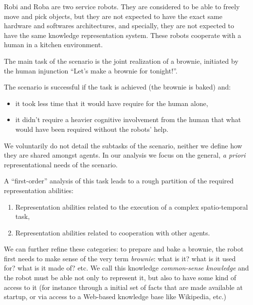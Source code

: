 \documentclass[a4paper, twocolumn]{article}
\begin{document}
Robi and Roba are two service robots. They are considered to be able to freely
move and pick objects, but they are not expected to have the exact same
hardware and softwares architectures, and specially, they are not expected to
have the same knowledge representation system. These robots cooperate with a
human in a kitchen environment.

The main task of the scenario is the joint realization of a brownie, initiated
by the human injunction ``Let's make a brownie for tonight!''.

The scenario is successful if the task is achieved (the brownie is baked) and:

\begin{itemize} 

	\item it took less time that it would have require for the human alone, 

	\item it didn't require a heavier cognitive involvement from the human that
	what would have been required without the robots' help.  

\end{itemize}

We voluntarily do not detail the subtasks of the scenario, neither we define
how they are shared amongst agents. In our analysis we focus on the general,
\textit{a priori} representational needs of the scenario.

A ``first-order'' analysis of this task leads to a rough partition of the
required representation abilities:

\begin{enumerate}

	\item Representation abilities related to the execution of a complex
	spatio-temporal task,

	\item Representation abilities related to cooperation with other agents.

\end{enumerate}

We can further refine these categories: to prepare and bake a brownie, the
robot first needs to make sense of the very term \emph{brownie}: what is it?
what is it used for? what is it made of? etc. We call this knowledge
\emph{common-sense knowledge} and the robot must be able not only to represent
it, but also to have some kind of access to it (for instance through a initial
set of facts that are made available at startup, or via access to a Web-based
knowledge base like Wikipedia, etc.)
\end{document}
